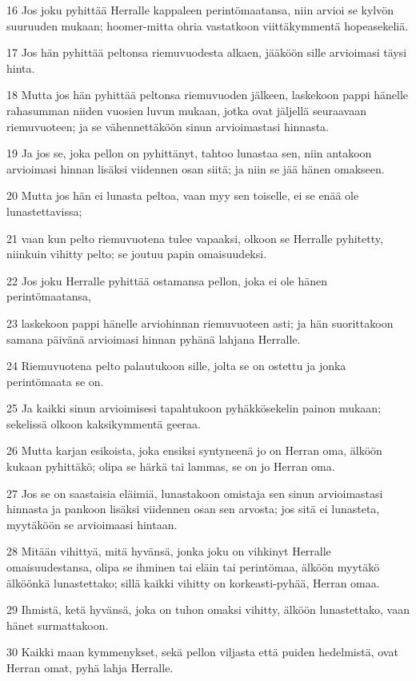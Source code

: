\par 16 Jos joku pyhittää Herralle kappaleen perintömaatansa, niin arvioi se kylvön suuruuden mukaan; hoomer-mitta ohria vastatkoon viittäkymmentä hopeasekeliä.
\par 17 Jos hän pyhittää peltonsa riemuvuodesta alkaen, jääköön sille arvioimasi täysi hinta.
\par 18 Mutta jos hän pyhittää peltonsa riemuvuoden jälkeen, laskekoon pappi hänelle rahasumman niiden vuosien luvun mukaan, jotka ovat jäljellä seuraavaan riemuvuoteen; ja se vähennettäköön sinun arvioimastasi hinnasta.
\par 19 Ja jos se, joka pellon on pyhittänyt, tahtoo lunastaa sen, niin antakoon arvioimasi hinnan lisäksi viidennen osan siitä; ja niin se jää hänen omakseen.
\par 20 Mutta jos hän ei lunasta peltoa, vaan myy sen toiselle, ei se enää ole lunastettavissa;
\par 21 vaan kun pelto riemuvuotena tulee vapaaksi, olkoon se Herralle pyhitetty, niinkuin vihitty pelto; se joutuu papin omaisuudeksi.
\par 22 Jos joku Herralle pyhittää ostamansa pellon, joka ei ole hänen perintömaatansa,
\par 23 laskekoon pappi hänelle arviohinnan riemuvuoteen asti; ja hän suorittakoon samana päivänä arvioimasi hinnan pyhänä lahjana Herralle.
\par 24 Riemuvuotena pelto palautukoon sille, jolta se on ostettu ja jonka perintömaata se on.
\par 25 Ja kaikki sinun arvioimisesi tapahtukoon pyhäkkösekelin painon mukaan; sekelissä olkoon kaksikymmentä geeraa.
\par 26 Mutta karjan esikoista, joka ensiksi syntyneenä jo on Herran oma, älköön kukaan pyhittäkö; olipa se härkä tai lammas, se on jo Herran oma.
\par 27 Jos se on saastaisia eläimiä, lunastakoon omistaja sen sinun arvioimastasi hinnasta ja pankoon lisäksi viidennen osan sen arvosta; jos sitä ei lunasteta, myytäköön se arvioimaasi hintaan.
\par 28 Mitään vihittyä, mitä hyvänsä, jonka joku on vihkinyt Herralle omaisuudestansa, olipa se ihminen tai eläin tai perintömaa, älköön myytäkö älköönkä lunastettako; sillä kaikki vihitty on korkeasti-pyhää, Herran omaa.
\par 29 Ihmistä, ketä hyvänsä, joka on tuhon omaksi vihitty, älköön lunastettako, vaan hänet surmattakoon.
\par 30 Kaikki maan kymmenykset, sekä pellon viljasta että puiden hedelmistä, ovat Herran omat, pyhä lahja Herralle.
